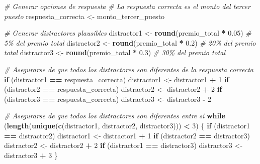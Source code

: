 \documentclass[
]{article}
\newenvironment{Shaded}{\begin{snugshade}}{\end{snugshade}}
\newcommand{\CommentTok}[1]{\textcolor[rgb]{0.56,0.35,0.01}{\textit{#1}}}
\newcommand{\ControlFlowTok}[1]{\textcolor[rgb]{0.13,0.29,0.53}{\textbf{#1}}}
\newcommand{\DecValTok}[1]{\textcolor[rgb]{0.00,0.00,0.81}{#1}}
\newcommand{\FloatTok}[1]{\textcolor[rgb]{0.00,0.00,0.81}{#1}}
\newcommand{\FunctionTok}[1]{\textcolor[rgb]{0.13,0.29,0.53}{\textbf{#1}}}
\newcommand{\NormalTok}[1]{#1}
\newcommand{\OtherTok}[1]{\textcolor[rgb]{0.56,0.35,0.01}{#1}}
\newcommand{\SpecialCharTok}[1]{\textcolor[rgb]{0.81,0.36,0.00}{\textbf{#1}}}
\begin{document}
\begin{Shaded}
\begin{Highlighting}[]
\CommentTok{\# Generar opciones de respuesta}
\CommentTok{\# La respuesta correcta es el monto del tercer puesto}
\NormalTok{respuesta\_correcta }\OtherTok{\textless{}{-}}\NormalTok{ monto\_tercer\_puesto}

\CommentTok{\# Generar distractores plausibles}
\NormalTok{distractor1 }\OtherTok{\textless{}{-}} \FunctionTok{round}\NormalTok{(premio\_total }\SpecialCharTok{*} \FloatTok{0.05}\NormalTok{)  }\CommentTok{\# 5\% del premio total}
\NormalTok{distractor2 }\OtherTok{\textless{}{-}} \FunctionTok{round}\NormalTok{(premio\_total }\SpecialCharTok{*} \FloatTok{0.2}\NormalTok{)   }\CommentTok{\# 20\% del premio total}
\NormalTok{distractor3 }\OtherTok{\textless{}{-}} \FunctionTok{round}\NormalTok{(premio\_total }\SpecialCharTok{*} \FloatTok{0.3}\NormalTok{)   }\CommentTok{\# 30\% del premio total}

\CommentTok{\# Asegurarse de que todos los distractores son diferentes de la respuesta correcta}
\ControlFlowTok{if}\NormalTok{ (distractor1 }\SpecialCharTok{==}\NormalTok{ respuesta\_correcta) distractor1 }\OtherTok{\textless{}{-}}\NormalTok{ distractor1 }\SpecialCharTok{+} \DecValTok{1}
\ControlFlowTok{if}\NormalTok{ (distractor2 }\SpecialCharTok{==}\NormalTok{ respuesta\_correcta) distractor2 }\OtherTok{\textless{}{-}}\NormalTok{ distractor2 }\SpecialCharTok{+} \DecValTok{2}
\ControlFlowTok{if}\NormalTok{ (distractor3 }\SpecialCharTok{==}\NormalTok{ respuesta\_correcta) distractor3 }\OtherTok{\textless{}{-}}\NormalTok{ distractor3 }\SpecialCharTok{{-}} \DecValTok{2}

\CommentTok{\# Asegurarse de que todos los distractores son diferentes entre sí}
\ControlFlowTok{while}\NormalTok{ (}\FunctionTok{length}\NormalTok{(}\FunctionTok{unique}\NormalTok{(}\FunctionTok{c}\NormalTok{(distractor1, distractor2, distractor3))) }\SpecialCharTok{\textless{}} \DecValTok{3}\NormalTok{) \{}
  \ControlFlowTok{if}\NormalTok{ (distractor1 }\SpecialCharTok{==}\NormalTok{ distractor2) distractor1 }\OtherTok{\textless{}{-}}\NormalTok{ distractor1 }\SpecialCharTok{+} \DecValTok{1}
  \ControlFlowTok{if}\NormalTok{ (distractor2 }\SpecialCharTok{==}\NormalTok{ distractor3) distractor2 }\OtherTok{\textless{}{-}}\NormalTok{ distractor2 }\SpecialCharTok{+} \DecValTok{2}
  \ControlFlowTok{if}\NormalTok{ (distractor1 }\SpecialCharTok{==}\NormalTok{ distractor3) distractor3 }\OtherTok{\textless{}{-}}\NormalTok{ distractor3 }\SpecialCharTok{+} \DecValTok{3}
\NormalTok{\}}


\end{Highlighting}
\end{Shaded}
\end{document}

